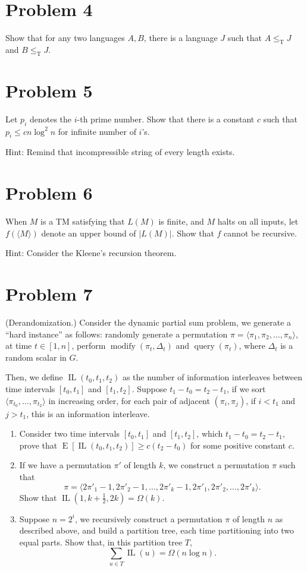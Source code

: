 \documentclass[12pt]{article}
\DeclareMathOperator{\E}{E}
\begin{document}
\section*{Problem 4}

Show that for any two languages $A,B$, there is a language $J$ such that $A\le_{\mathrm{T}} J$ and $B\le_{\mathrm{T}} J$.

\section*{Problem 5}

Let $p_i$ denotes the $i$-th prime number. Show that there is a constant $c$ such that $p_i\le cn\log^2 n$ for infinite number of $i$'s.

Hint: Remind that incompressible string of every length exists.

\section*{Problem 6}

When $M$ is a TM satisfying that $L(M)$ is finite, and $M$ halts on all inputs, let $f(\langle M\rangle)$ denote an upper bound of $\lvert L(M)\rvert$. Show that $f$ cannot be recursive.

Hint: Consider the Kleene's recursion theorem.

\section*{Problem 7}

(Derandomization.) Consider the dynamic partial sum problem, we generate a ``hard instance'' as follows: randomly generate a permutation $\pi=\langle \pi_1,\pi_2,\dots,\pi_n\rangle$, at time $t\in [1,n]$, perform $\operatorname{modify}(\pi_t,\Delta_t)$ and $\operatorname{query}(\pi_t)$, where $\Delta_t$ is a random scalar in $G$. 

Then, we define $\operatorname{IL}(t_0,t_1,t_2)$ as the number of information interleaves between time intervals $[t_0,t_1]$ and $[t_1,t_2]$. Suppose $t_1-t_0=t_2-t_1$, if we sort $\langle \pi_{t_0},\dots,\pi_{t_2}\rangle$ in increasing order, for each pair of adjacent $(\pi_i,\pi_j)$, if $i<t_1$ and $j>t_1$, this is an information interleave.

\begin{enumerate}
	\item Consider two time intervals $[t_0,t_1]$ and $[t_1,t_2]$, which $t_1-t_0=t_2-t_1$, prove that $\E[\operatorname{IL}(t_0,t_1,t_2)]\ge c(t_2-t_0)$ for some positive constant $c$.
	\item If we have a permutation $\pi'$ of length $k$, we construct a permutation $\pi$ such that
	$$
	\pi=\langle 2\pi'_1-1,2\pi'_2-1,\dots,2\pi'_k-1,2\pi'_1,2\pi'_2,\dots,2\pi'_k\rangle.
	$$
	Show that $\operatorname{IL}(1,k+\frac{1}{2},2k)=\Omega(k)$.
	\item Suppose $n=2^i$, we recursively construct a permutation $\pi$ of length $n$ as described above, and build a partition tree, each time partitioning into two equal parts. Show that, in this partition tree $T$,
	$$
	\sum_{u\in T} \operatorname{IL}(u)=\Omega(n\log n).
	$$
\end{enumerate}
\end{document}
